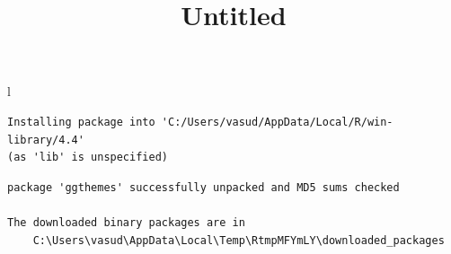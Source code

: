 \documentclass[
  10pt,
]{article}
\title{Untitled}
\author{}
\date{}
\begin{document}
\maketitle


l

\begin{verbatim}
Installing package into 'C:/Users/vasud/AppData/Local/R/win-library/4.4'
(as 'lib' is unspecified)
\end{verbatim}

\begin{verbatim}
package 'ggthemes' successfully unpacked and MD5 sums checked

The downloaded binary packages are in
    C:\Users\vasud\AppData\Local\Temp\RtmpMFYmLY\downloaded_packages
\end{verbatim}
\end{document}
